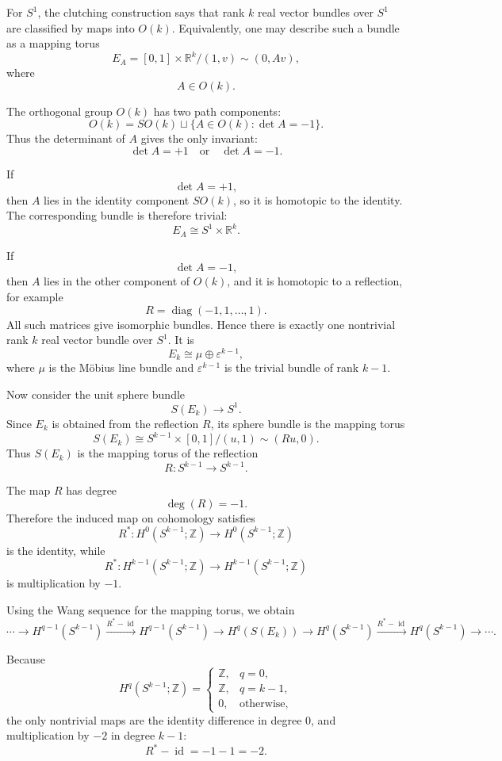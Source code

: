 \begin{solution}
For \(S^1\), the clutching construction says that rank \(k\) real vector bundles over \(S^1\) are classified by maps into \(O(k)\). Equivalently, one may describe such a bundle as a mapping torus
\[
E_A
=
[0,1]\times \mathbb{R}^k
\big/
(1,v)\sim (0,Av),
\]
where
\[
A\in O(k).
\]

The orthogonal group \(O(k)\) has two path components:
\[
O(k)=SO(k)\sqcup \{A\in O(k):\det A=-1\}.
\]
Thus the determinant of \(A\) gives the only invariant:
\[
\det A=+1
\quad\text{or}\quad
\det A=-1.
\]

If
\[
\det A=+1,
\]
then \(A\) lies in the identity component \(SO(k)\), so it is homotopic to the identity. The corresponding bundle is therefore trivial:
\[
E_A\cong S^1\times \mathbb{R}^k.
\]

If
\[
\det A=-1,
\]
then \(A\) lies in the other component of \(O(k)\), and it is homotopic to a reflection, for example
\[
R=\operatorname{diag}(-1,1,\dots,1).
\]
All such matrices give isomorphic bundles. Hence there is exactly one nontrivial rank \(k\) real vector bundle over \(S^1\). It is
\[
E_k\cong \mu\oplus \varepsilon^{k-1},
\]
where \(\mu\) is the Möbius line bundle and \(\varepsilon^{k-1}\) is the trivial bundle of rank \(k-1\).

Now consider the unit sphere bundle
\[
S(E_k)\to S^1.
\]
Since \(E_k\) is obtained from the reflection \(R\), its sphere bundle is the mapping torus
\[
S(E_k)
\cong
S^{k-1}\times [0,1]
\big/
(u,1)\sim (Ru,0).
\]
Thus \(S(E_k)\) is the mapping torus of the reflection
\[
R:S^{k-1}\to S^{k-1}.
\]

The map \(R\) has degree
\[
\deg(R)=-1.
\]
Therefore the induced map on cohomology satisfies
\[
R^*:H^0(S^{k-1};\mathbb{Z})\to H^0(S^{k-1};\mathbb{Z})
\]
is the identity, while
\[
R^*:H^{k-1}(S^{k-1};\mathbb{Z})
\to
H^{k-1}(S^{k-1};\mathbb{Z})
\]
is multiplication by \(-1\).

Using the Wang sequence for the mapping torus, we obtain
\[
\cdots
\to
H^{q-1}(S^{k-1})
\xrightarrow{R^*-\operatorname{id}}
H^{q-1}(S^{k-1})
\to
H^q(S(E_k))
\to
H^q(S^{k-1})
\xrightarrow{R^*-\operatorname{id}}
H^q(S^{k-1})
\to
\cdots .
\]

Because
\[
H^q(S^{k-1};\mathbb{Z})
=
\begin{cases}
	\mathbb{Z}, & q=0,\\
	\mathbb{Z}, & q=k-1,\\
	0, & \text{otherwise},
\end{cases}
\]
the only nontrivial maps are the identity difference in degree \(0\), and multiplication by \(-2\) in degree \(k-1\):
\[
R^*-\operatorname{id}
=
-1-1
=
-2.
\]


\end{solution}

